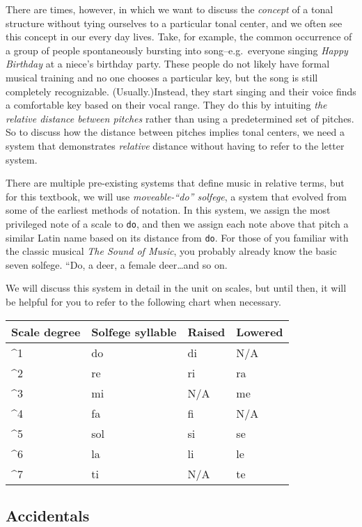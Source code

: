 \documentclass{book}
\begin{document}
There are times, however, in which we want to discuss the \emph{concept} of a
tonal structure without tying ourselves to a particular tonal center, and we
often see this concept in our every day lives. Take, for example, the common
occurrence of a group of people spontaneously bursting into
song--e.g.~everyone singing \emph{Happy Birthday} at a niece's birthday party.
These people do not likely have formal musical training and no one chooses a
particular key, but the song is still completely recognizable.
(Usually.)Instead, they start singing and their voice finds a comfortable key
based on their vocal range. They do this by intuiting \emph{the relative
distance between pitches} rather than using a predetermined set of pitches. So
to discuss how the distance between pitches implies tonal centers, we need a
system that demonstrates \emph{relative} distance without having to refer to
the letter system.

There are multiple pre-existing systems that define music in relative terms,
but for this textbook, we will use \emph{moveable-``do'' solfege}, a system
that evolved from some of the earliest methods of notation. In this system, we
assign the most privileged note of a scale to \texttt{do}, and then we assign
each note above that pitch a similar Latin name based on its distance from
\texttt{do}. For those of you familiar with the classic musical \emph{The
Sound of Music}, you probably already know the basic seven solfege. ``Do, a
deer, a female deer\ldots and so on.

We will discuss this system in detail in the unit on scales, but until then,
it will be helpful for you to refer to the following chart when necessary.

\begin{longtable}[]{@{}llll@{}}
\toprule
Scale degree & Solfege syllable & Raised & Lowered \\
\midrule
\endhead
\^{}1 & do & di & N/A \\
\^{}2 & re & ri & ra \\
\^{}3 & mi & N/A & me \\
\^{}4 & fa & fi & N/A \\
\^{}5 & sol & si & se \\
\^{}6 & la & li & le \\
\^{}7 & ti & N/A & te \\
\bottomrule
\end{longtable}

\hypertarget{accidentals-1}{%
\subsection{Accidentals}\label{accidentals-1}}
\end{document}
